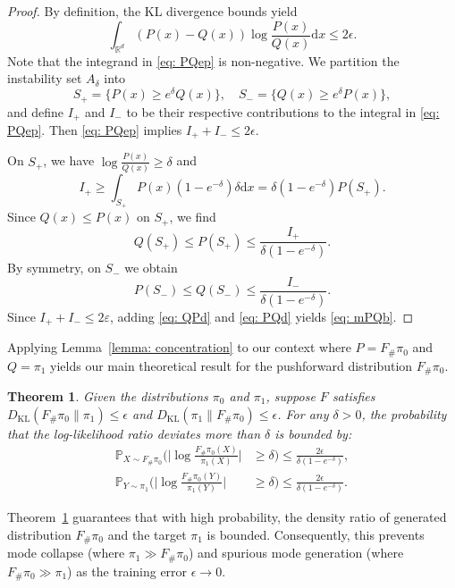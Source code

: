 \documentclass[%
 reprint,
 amsmath,amssymb,
 aps,
 pre,
]{revtex4-2}
\newtheorem{theorem}{Theorem}
\DeclareMathOperator{\KL}{KL}
\newcommand{\D}{\mathrm{d}}
\newcommand{\Ge}{\geqslant}
\newcommand{\Le}{\leqslant}
\newcommand{\ep}{\varepsilon}
\begin{document}
\begin{proof}
By definition, the KL divergence bounds yield
\begin{equation}
\int_{\mathbb R^d} (P(x) - Q(x))\log\frac{P(x)}{Q(x)} \D x \Le 2\epsilon.
\label{eq: PQep}
\end{equation}
Note that the integrand in \eqref{eq: PQep} is non-negative. We partition the instability set $A_\delta$ into
\begin{equation*}
	S_+ = \{P(x) \Ge e^\delta Q(x)\}, \quad S_- = \{Q(x) \Ge e^\delta P(x)\},
\end{equation*}
and define $I_+$ and $I_-$ to be their respective contributions to the integral in \eqref{eq: PQep}. Then \eqref{eq: PQep} implies $I_++I_-\Le 2\epsilon$.

On $S_+$, we have $\log\frac{P(x)}{Q(x)} \Ge \delta$ and
\begin{equation*}
	I_+ \Ge \int_{S_+} P(x)(1-e^{-\delta})\delta \D x = \delta(1-e^{-\delta})P(S_+).
\end{equation*}
Since $Q(x) \Le P(x)$ on $S_+$, we find
\begin{equation}
	Q(S_+) \Le P(S_+) \Le \frac{I_+}{\delta(1-e^{-\delta})}.
	\label{eq: QPd}
\end{equation}
By symmetry, on $S_-$ we obtain
\begin{equation}
	P(S_-) \Le Q(S_-) \Le \frac{I_-}{\delta(1-e^{-\delta})}.
	\label{eq: PQd}
\end{equation}
Since $I_++I_-\Le 2\ep$, adding \eqref{eq: QPd} and \eqref{eq: PQd} yields \eqref{eq: mPQb}.
\end{proof}

Applying Lemma~\ref{lemma: concentration} to our context where $P = F_\# \pi_0$ and $Q = \pi_1$ yields our main theoretical result for the pushforward distribution $F_\#\pi_0$.

\begin{theorem}
\label{theorem: concentration}
Given the distributions $\pi_0$ and $\pi_1$,
suppose $F$ satisfies $D_{\KL}(F_\#\pi_0\|\pi_1) \Le \epsilon$ and $D_{\KL}(\pi_1\|F_\#\pi_0) \Le \epsilon$. For any $\delta > 0$, the probability that the log-likelihood ratio deviates more than $\delta$ is bounded by:
\begin{align}
	\mathbb{P}_{X\sim F_\#\pi_0} \bigg( \bigg| \log \frac{F_\#\pi_0(X)}{\pi_1(X)} \bigg| & \Ge \delta \bigg) 
	\Le \frac{2\epsilon}{\delta(1 - e^{-\delta})},	\\
 \mathbb{P}_{Y\sim \pi_1} \bigg( \bigg| \log \frac{F_\#\pi_0(Y)}{\pi_1(Y)} \bigg| & \Ge \delta \bigg) \Le \frac{2\epsilon}{\delta(1 - e^{-\delta})}.
\end{align}
\end{theorem}
Theorem~\ref{theorem: concentration} guarantees that with high probability, the density ratio of generated distribution $F_\#\pi_0$ and the target $\pi_1$ is bounded. Consequently, this prevents mode collapse (where $\pi_1 \gg F_\#\pi_0$) and spurious mode generation (where $F_\#\pi_0 \gg \pi_1$) as the training error $\epsilon \to 0$.
\end{document}
